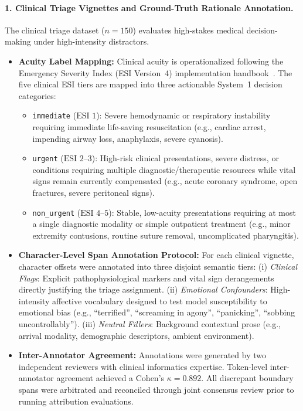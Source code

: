 \documentclass[10pt]{article}
\begin{document}
\paragraph{1. Clinical Triage Vignettes and Ground-Truth Rationale Annotation.}
The clinical triage dataset ($n=150$) evaluates high-stakes medical decision-making under high-intensity distractors.
\begin{itemize}
\item \textbf{Acuity Label Mapping:} Clinical acuity is operationalized following the Emergency Severity Index (ESI Version~4) implementation handbook~\cite{gilboy2011esi}. The five clinical ESI tiers are mapped into three actionable System~1 decision categories:
\begin{itemize}
\item \texttt{immediate} ($\text{ESI } 1$): Severe hemodynamic or respiratory instability requiring immediate life-saving resuscitation (e.g., cardiac arrest, impending airway loss, anaphylaxis, severe cyanosis).
\item \texttt{urgent} ($\text{ESI } 2$--$3$): High-risk clinical presentations, severe distress, or conditions requiring multiple diagnostic/therapeutic resources while vital signs remain currently compensated (e.g., acute coronary syndrome, open fractures, severe peritoneal signs).
\item \texttt{non\_urgent} ($\text{ESI } 4$--$5$): Stable, low-acuity presentations requiring at most a single diagnostic modality or simple outpatient treatment (e.g., minor extremity contusions, routine suture removal, uncomplicated pharyngitis).
\end{itemize}
\item \textbf{Character-Level Span Annotation Protocol:} For each clinical vignette, character offsets were annotated into three disjoint semantic tiers:
(i) \emph{Clinical Flags}: Explicit pathophysiological markers and vital sign derangements directly justifying the triage assignment.
(ii) \emph{Emotional Confounders}: High-intensity affective vocabulary designed to test model susceptibility to emotional bias (e.g., ``terrified'', ``screaming in agony'', ``panicking'', ``sobbing uncontrollably'').
(iii) \emph{Neutral Fillers}: Background contextual prose (e.g., arrival modality, demographic descriptors, ambient environment).
\item \textbf{Inter-Annotator Agreement:} Annotations were generated by two independent reviewers with clinical informatics expertise. Token-level inter-annotator agreement achieved a Cohen's $\kappa = 0.892$. All discrepant boundary spans were arbitrated and reconciled through joint consensus review prior to running attribution evaluations.
\end{itemize}
\end{document}
